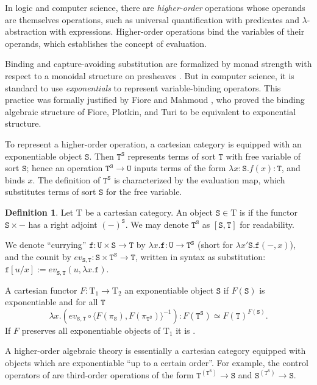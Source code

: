 \documentclass[conference]{IEEEtran}
\theoremstyle{definition}
\newtheorem{definition}[theorem]{Definition}
\newcommand{\define}[1]{{\bf \boldmath{#1}}}
\newcommand{\mrm}[1]{\mathrm{#1}}
\newcommand{\mtt}[1]{\mathtt{#1}}
\newcommand{\T}{\mrm{T}}
\newcommand{\tts}{\mtt{S}}
\newcommand{\ttt}{\mtt{T}}
\newcommand{\ttu}{\mtt{U}}
\newcommand{\ttf}{\mtt{f}}
\begin{document}
In logic and computer science, there are \textit{higher-order} operations whose operands are themselves operations, such as universal quantification with predicates and $\lambda$-abstraction with expressions. Higher-order operations bind the variables of their operands, which establishes the concept of evaluation.

Binding and capture-avoiding substitution are formalized by monad strength with respect to a monoidal structure on presheaves \cite{abssyn}. But in computer science, it is standard to use \textit{exponentials} to represent variable-binding operators. This practice was formally justified by Fiore and Mahmoud \cite{soats}, who proved the binding algebraic structure of Fiore, Plotkin, and Turi \cite{abssyn} to be equivalent to exponential structure.

To represent a higher-order operation, a cartesian category is equipped with an exponentiable object $\tts$. Then $\ttt^\tts$ represents terms of sort $\ttt$ with free variable of sort $\tts$; hence an operation $\ttt^\tts\to \ttu$ inputs terms of the form $\lambda x:\tts.f(x):\ttt$, and binds $x$. The definition of $\ttt^\tts$ is characterized by the evaluation map, which substitutes terms of sort $\tts$ for the free variable.

\begin{definition}
    Let $\T$ be a cartesian category. An object $\tts\in \T$ is \define{exponentiable} if the functor $\tts\times -$ has a right adjoint $(-)^\tts$. We may denote $\ttt^\tts$ as $[\tts,\ttt]$ for readability.

    
    We denote ``currying'' $\ttf:\ttu\times \tts\to \ttt$ by $\lambda x.\ttf:\ttu\to \ttt^\tts$ (short for $\lambda x'\tts.\ttf(-,x)$), and the counit by $ev_{\tts,\ttt}:\tts\times \ttt^\tts\to \ttt$, written in syntax as substitution: $\ttf[u/x] := ev_{\tts,\ttt}(u,\lambda x.\ttf)$.
    
    A cartesian functor $F:\T_1\to \T_2$ \define{preserves} an exponentiable object $\tts$ if $F(\tts)$ is exponentiable and for all $\ttt$ $$\lambda x.(ev_{\tts,\ttt}\circ \langle F(\pi_\tts),F(\pi_{\ttt^\tts})\rangle^{-1}):F(\ttt^\tts)\simeq F(\ttt)^{F(\tts)}.$$ If $F$ preserves all exponentiable objects of $\T_1$ it is \define{cartex}.
\end{definition}

A higher-order algebraic theory is essentially a cartesian category equipped with objects which are exponentiable ``up to a certain order''. For example, the control operators of \cite{escard} are third-order operations of the form $\ttt^{(\ttt^\tts)}\to \tts$ and $\tts^{(\ttt^\tts)}\to \tts$.
\end{document}
